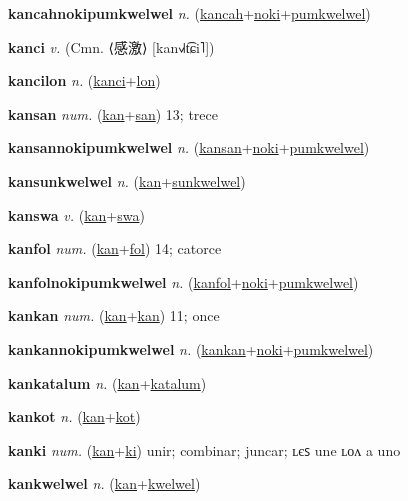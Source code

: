\textbf{\hypertarget{kancahnokipumkwelwel}{kancahnokipumkwelwel}} \textit{n.} (\hyperlink{kancah}{kancah}+\allowbreak \hyperlink{noki}{noki}+\allowbreak \hyperlink{pumkwelwel}{pumkwelwel})


\textbf{\hypertarget{kanci}{kanci}} \textit{v.} (Cmn. ⟨{\chinese{}感激}⟩ [kan˧˩˧t͡ɕi˥])


\textbf{\hypertarget{kancilon}{kancilon}} \textit{n.} (\hyperlink{kanci}{kanci}+\allowbreak \hyperlink{lon}{lon})


\textbf{\hypertarget{kansan}{kansan}} \textit{num.} (\hyperlink{kan}{kan}+\allowbreak \hyperlink{san}{san})
13; trece

\textbf{\hypertarget{kansannokipumkwelwel}{kansannokipumkwelwel}} \textit{n.} (\hyperlink{kansan}{kansan}+\allowbreak \hyperlink{noki}{noki}+\allowbreak \hyperlink{pumkwelwel}{pumkwelwel})


\textbf{\hypertarget{kansunkwelwel}{kansunkwelwel}} \textit{n.} (\hyperlink{kan}{kan}+\allowbreak \hyperlink{sunkwelwel}{sunkwelwel})


\textbf{\hypertarget{kanswa}{kanswa}} \textit{v.} (\hyperlink{kan}{kan}+\allowbreak \hyperlink{swa}{swa})


\textbf{\hypertarget{kanfol}{kanfol}} \textit{num.} (\hyperlink{kan}{kan}+\allowbreak \hyperlink{fol}{fol})
14; catorce

\textbf{\hypertarget{kanfolnokipumkwelwel}{kanfolnokipumkwelwel}} \textit{n.} (\hyperlink{kanfol}{kanfol}+\allowbreak \hyperlink{noki}{noki}+\allowbreak \hyperlink{pumkwelwel}{pumkwelwel})


\textbf{\hypertarget{kankan}{kankan}} \textit{num.} (\hyperlink{kan}{kan}+\allowbreak \hyperlink{kan}{kan})
11; once

\textbf{\hypertarget{kankannokipumkwelwel}{kankannokipumkwelwel}} \textit{n.} (\hyperlink{kankan}{kankan}+\allowbreak \hyperlink{noki}{noki}+\allowbreak \hyperlink{pumkwelwel}{pumkwelwel})


\textbf{\hypertarget{kankatalum}{kankatalum}} \textit{n.} (\hyperlink{kan}{kan}+\allowbreak \hyperlink{katalum}{katalum})


\textbf{\hypertarget{kankot}{kankot}} \textit{n.} (\hyperlink{kan}{kan}+\allowbreak \hyperlink{kot}{kot})


\textbf{\hypertarget{kanki}{kanki}} \textit{num.} (\hyperlink{kan}{kan}+\allowbreak \hyperlink{ki}{ki})
unir; combinar; juncar; ʟєꜱ une ʟᴏᴧ a uno

\textbf{\hypertarget{kankwelwel}{kankwelwel}} \textit{n.} (\hyperlink{kan}{kan}+\allowbreak \hyperlink{kwelwel}{kwelwel})


